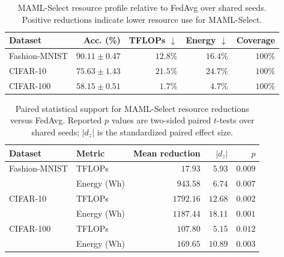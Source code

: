 \documentclass[10pt]{article}
\begin{document}
\begin{table}[!ht]
\centering
\caption{MAML-Select resource profile relative to FedAvg over shared seeds.  Positive reductions indicate lower resource use for MAML-Select.}
\label{tab:supp_reductions}
\small
\begin{tabular}{@{}lrrrr@{}}
\toprule
Dataset & Acc. (\%) & TFLOPs $\downarrow$ & Energy $\downarrow$ & Coverage \\
\midrule
Fashion-MNIST & $90.11 \pm 0.47$ & $12.8\%$ & $16.4\%$ & $100\%$ \\
CIFAR-10 & $75.63 \pm 1.43$ & $21.5\%$ & $24.7\%$ & $100\%$ \\
CIFAR-100 & $58.15 \pm 0.51$ & $1.7\%$ & $4.7\%$ & $100\%$ \\
\bottomrule
\end{tabular}
\end{table}

\begin{table}[!ht]
\centering
\caption{Paired statistical support for MAML-Select resource reductions versus FedAvg.  Reported $p$ values are two-sided paired $t$-tests over shared seeds; $|d_z|$ is the standardized paired effect size.}
\label{tab:supp_stats}
\small
\begin{tabular}{@{}llrrr@{}}
\toprule
Dataset & Metric & Mean reduction & $|d_z|$ & $p$ \\
\midrule
Fashion-MNIST & TFLOPs & $17.93$ & $5.93$ & $0.009$ \\
 & Energy (Wh) & $943.58$ & $6.74$ & $0.007$ \\
\midrule
CIFAR-10 & TFLOPs & $1792.16$ & $12.68$ & $0.002$ \\
 & Energy (Wh) & $1187.44$ & $18.11$ & $0.001$ \\
\midrule
CIFAR-100 & TFLOPs & $107.80$ & $5.15$ & $0.012$ \\
 & Energy (Wh) & $169.65$ & $10.89$ & $0.003$ \\
\bottomrule
\end{tabular}
\end{table}

\end{document}

